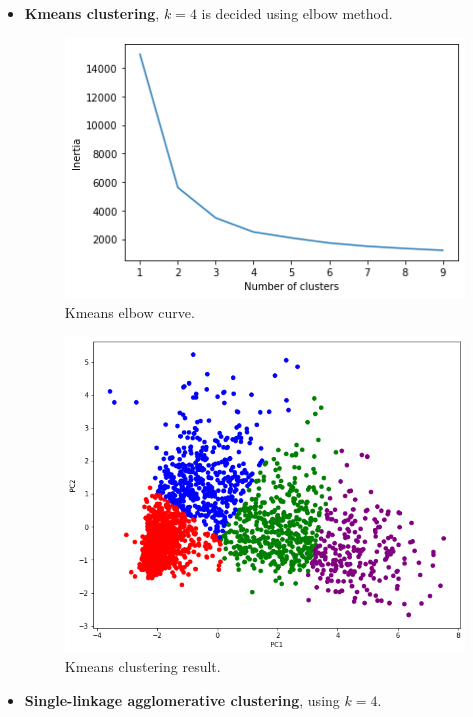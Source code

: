 \documentclass[11pt]{article}
\begin{document}
\begin{itemize}
\item \textbf{Kmeans clustering}, $k=4$ is decided using elbow method.
\begin{figure}[h!]
\centerline{\includegraphics[scale=0.5]{clu_4.png}}
\caption{Kmeans elbow curve.}
\end{figure}

\begin{figure}[h!]
\centerline{\includegraphics[scale=0.5]{clu_5.png}}
\caption{Kmeans clustering result.}
\end{figure}

\newpage

\item \textbf{Single-linkage agglomerative clustering}, using $k=4$.


\end{itemize}
\end{document}
